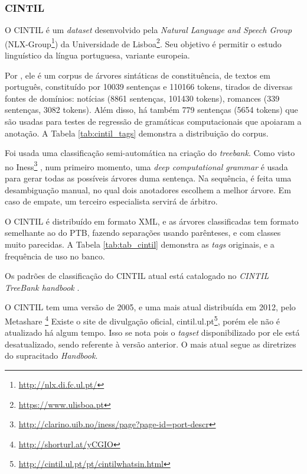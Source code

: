 \subsubsection{CINTIL}
\label{subsec:cintil}
O CINTIL é um \textit{dataset} desenvolvido pela \textit{Natural Language and Speech Group} (NLX-Group\footnote{ \url{http://nlx.di.fc.ul.pt/}}) da Universidade de Lisboa\footnote{\url{https://www.ulisboa.pt}}. Seu objetivo é permitir o estudo linguístico da língua portuguesa, variante europeia.

Por \cite[p~1]{narrativeDescriptionCintil}, ele é um corpus de árvores sintáticas de constituência, de textos em português, constituído por 10039 sentenças e 110166 tokens, tirados de diversas fontes de domínios: notícias (8861 sentenças, 101430 tokens), romances (339 sentenças, 3082 tokens). Além disso, há também 779 sentenças (5654 tokens) que são usadas para testes de regressão de gramáticas computacionais que apoiaram a anotação. A Tabela \ref{tab:cintil_tags} demonstra a distribuição do corpus.

\begin{center}

\end{center}

Foi usada uma classificação semi-automática na criação do \textit{treebank}. Como visto no Iness\footnote{\url{http://clarino.uib.no/iness/page?page-id=port-descr}} \cite{rosen2012open}, num primeiro momento, uma \textit{deep computational grammar} \cite{lxgram} é usada para gerar todas as possíveis árvores duma sentença. Na sequência, é feita uma desambiguação manual, no qual dois anotadores escolhem a melhor árvore. Em caso de empate, um terceiro especialista servirá de árbitro.

O CINTIL é distribuído em formato XML, e as árvores classificadas tem formato semelhante ao do PTB, fazendo separações usando parênteses, e com classes muito parecidas. A Tabela \ref{tab:tab_cintil} demonstra as \textit{tags} originais, e a frequência de uso no banco.

Os padrões de classificação do CINTIL atual está catalogado no \textit{CINTIL TreeBank handbook} \cite{cintil_handbook}.

O CINTIL tem uma versão de 2005, e uma mais atual distribuída em 2012, pelo Metashare
\footnote{\url{http://shorturl.at/yCGIO}}
Existe o site de divulgação oficial, cintil.ul.pt\footnote{\url{http://cintil.ul.pt/pt/cintilwhatsin.html}}, porém ele não é atualizado há algum tempo. Isso se nota pois o \textit{tagset} disponibilizado por ele está desatualizado, sendo referente à versão anterior. O mais atual segue as diretrizes do supracitado \textit{Handbook}.
